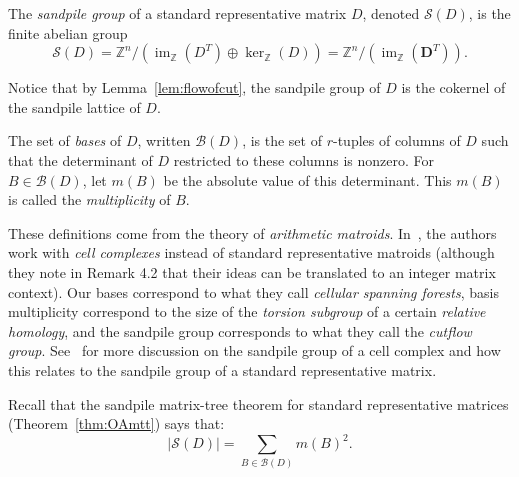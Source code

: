\documentclass[ALCO,ThmDefs,Unicode,epreuves]{cedram}
\newcommand{\Z}{\mathbb{Z}}
\newcommand{\D}{\mathbf{D}}
\newcommand{\Sand}{\mathcal{S}}
\DeclareMathOperator{\Ima}{im}
\begin{document}
\begin{defi}\label{def:sandpile}
The \emph{sandpile group} of a standard representative matrix $D$, denoted $\Sand(D)$, is the finite abelian group
\[
\Sand(D) = \Z^n / (\Ima_\Z(D^T) \oplus \ker_\Z(D)) = \Z^n / (\Ima_\Z(\D^T)).
\]
\end{defi}

Notice that by Lemma~\ref{lem:flowofcut}, the sandpile group of $D$ is the cokernel of the sandpile lattice of $D$. 

\begin{defi}\label{def:bandm}
The set of \emph{bases} of $D$, written $\mathcal B(D)$, is the set of $r$-tuples of columns of $D$ such that the determinant of $D$ restricted to these columns is nonzero. For $B \in \mathcal B(D)$, let $m(B)$ be the absolute value of this determinant. This $m(B)$ is called the \emph{multiplicity} of $B$. 
\end{defi}

\begin{rema} These definitions come from the theory of \emph{arithmetic matroids}. In~\cite{CutsFlows}, the authors work with \emph{cell complexes} instead of standard representative matroids (although they note in Remark 4.2 that their ideas can be translated to an integer matrix context). Our bases correspond to what they call \emph{cellular spanning forests}, basis multiplicity correspond to the size of the \emph{torsion subgroup} of a certain \emph{relative homology}, and the sandpile group corresponds to what they call the \emph{cutflow group}. See~{\cite[Section~6.6]{mythesis}} for more discussion on the sandpile group of a cell complex and how this relates to the sandpile group of a standard representative matrix. 
\end{rema}

Recall that the sandpile matrix-tree theorem for standard representative matrices (Theorem~\ref{thm:OAmtt}) says that:
\[
|\Sand(D)| = \sum_{B \in \mathcal B(D)} m(B)^2.
\]
\end{document}
